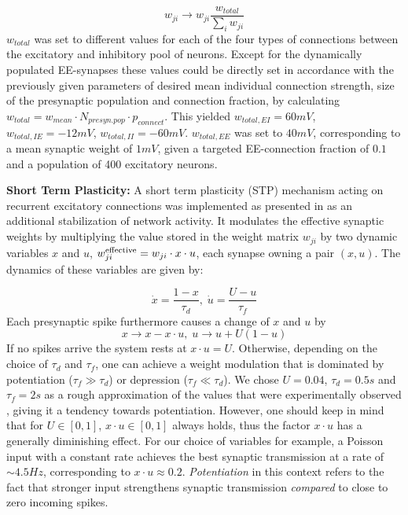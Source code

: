 \documentclass[10pt,a4paper]{article}
\begin{document}
\begin{equation}
w_{ji} \rightarrow w_{ji} \frac{w_{total}}{\sum_i w_{ji}}
\label{Synnnorm}
\end{equation}
$w_{total}$ was set to different values for each of the four types of connections between the excitatory and inhibitory pool of neurons. Except for the dynamically populated EE-synapses these values could be directly set in accordance with the previously given parameters of desired mean individual connection strength, size of the presynaptic population and connection fraction, by calculating $w_{total} = w_{mean} \cdot N_{presyn. pop}\cdot p_{connect}$. This yielded $w_{total,EI} = 60 mV$, $w_{total,IE} = -12 mV$, $w_{total,II} = -60 mV$. $w_{total,EE}$ was set to $40mV$,  corresponding to a mean synaptic weight of $1mV$, given a targeted EE-connection fraction of $0.1$ and a population of 400 excitatory neurons.

\textbf{Short Term Plasticity:} A short term plasticity (STP) mechanism acting on recurrent excitatory connections was implemented as presented in \cite{Markram_STP} as an additional stabilization of network activity. It modulates the effective synaptic weights by multiplying the value stored in the weight matrix $w_{ji}$ by two dynamic variables $x$ and $u$, $w^{\rm effective}_{ji} = w_{ji}\cdot x \cdot u$, each synapse owning a pair $(x,u)$. The dynamics of these variables are given by:

\begin{equation}
\dot{x} = \frac{1-x}{\tau_d},\; \dot{u} = \frac{U-u}{\tau_f}
\label{STP_dynamics1}
\end{equation}
Each presynaptic spike furthermore causes a change of $x$ and $u$ by
\begin{equation}
x \rightarrow x - x\cdot u,\; u \rightarrow u + U(1-u)
\label{STP_dynamics2}
\end{equation}
If no spikes arrive the system rests at $x\cdot u = U$. Otherwise, depending on the choice of $\tau_d$ and $\tau_f$, one can achieve a weight modulation that is dominated by potentiation ($\tau_f \gg \tau_d$) or depression ($\tau_f \ll \tau_d$). We chose $U=0.04$, $\tau_d = 0.5s$ and $\tau_f = 2s$ as a rough approximation of the values that were experimentally observed \cite{Markram_STP}, giving it a tendency towards potentiation. However, one should keep in mind that for $U\in [0,1]$, $x\cdot u \in [0,1]$ always holds, thus the factor $x\cdot u$ has a generally diminishing effect. For our choice of variables for example, a Poisson input with a constant rate achieves the best synaptic transmission at a rate of $\sim 4.5 Hz$, corresponding to $x\cdot u \approx 0.2$. \textit{Potentiation} in this context refers to the fact that stronger input strengthens synaptic transmission \emph{compared} to close to zero incoming spikes.
\end{document}
